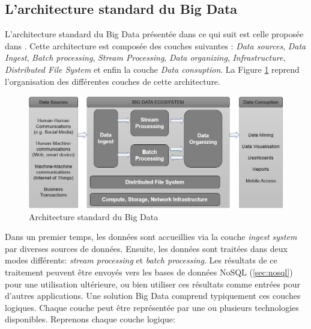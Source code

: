 		\subsection{L'architecture standard du Big Data}
		
		L'architecture standard du Big Data présentée dans ce qui suit est celle proposée dans  \cite{anil-big-data}. Cette architecture  est composée des couches suivantes :  \textit{Data sources}, \textit{Data Ingest}, \textit{Batch processing}, \textit{Stream Processing}, \textit{Data organizing}, \textit{Infrastructure}, \textit{Distributed File System} et enfin la couche \textit{Data consuption}. 
		 La Figure \ref{fig:bigdata-architecture} reprend l'organisation des différentes couches de cette architecture.
		 		\begin{figure}[h]
		 	\captionsetup{justification = centering}
		 	\centering
		 	\includegraphics[width=1\linewidth]{illustrations/bigdata-architecture}
		 	\caption{Architecture standard du Big Data \cite{anil-big-data}}
		 	\label{fig:bigdata-architecture}
		 	
		 \end{figure}
		
		Dans un premier temps, les données sont   accueillies   via la couche  \textit{ingest system} par diverses sources de données. Ensuite, les données sont traitées dans deux modes différents:  \textit{stream processing } et  \textit{batch processing}.  Les résultats de ce traitement peuvent être envoyés vers les bases de données NoSQL (\ref{sec:nosql}) pour une utilisation ultérieure, ou bien  utiliser ces résultats comme entrées pour d'autres applications.  Une solution Big Data comprend typiquement  ces  couches logiques. Chaque  couche peut être représentée par une ou plusieurs technologies disponibles. Reprenons chaque couche logique:
		
		
